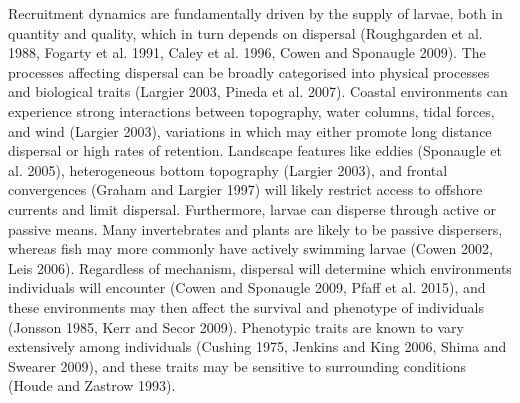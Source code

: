 \documentclass[]{book}
\begin{document}
Recruitment dynamics are fundamentally driven by the supply of larvae,
both in quantity and quality, which in turn depends on dispersal
(Roughgarden et al. 1988, Fogarty et al. 1991, Caley et al. 1996, Cowen
and Sponaugle 2009). The processes affecting dispersal can be broadly
categorised into physical processes and biological traits (Largier 2003,
Pineda et al. 2007). Coastal environments can experience strong
interactions between topography, water columns, tidal forces, and wind
(Largier 2003), variations in which may either promote long distance
dispersal or high rates of retention. Landscape features like eddies
(Sponaugle et al. 2005), heterogeneous bottom topography (Largier 2003),
and frontal convergences (Graham and Largier 1997) will likely restrict
access to offshore currents and limit dispersal. Furthermore, larvae can
disperse through active or passive means. Many invertebrates and plants
are likely to be passive dispersers, whereas fish may more commonly have
actively swimming larvae (Cowen 2002, Leis 2006). Regardless of
mechanism, dispersal will determine which environments individuals will
encounter (Cowen and Sponaugle 2009, Pfaff et al. 2015), and these
environments may then affect the survival and phenotype of individuals
(Jonsson 1985, Kerr and Secor 2009). Phenotypic traits are known to vary
extensively among individuals (Cushing 1975, Jenkins and King 2006,
Shima and Swearer 2009), and these traits may be sensitive to
surrounding conditions (Houde and Zastrow 1993).
\end{document}

